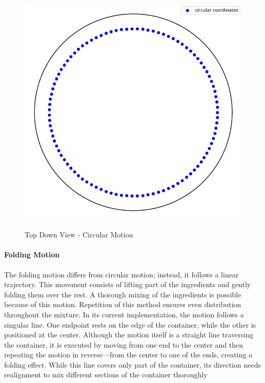 \begin{figure}[H]
    \includegraphics[scale=0.35]{Graphics/motions/circular_motion.png}
    \centering
    \label{fig:circularMotion}
    \caption{Top Down View - Circular Motion}
\end{figure}

\paragraph{Folding Motion}
The folding motion differs from circular motion; instead, it follows a linear trajectory.
This movement consists of lifting part of the ingredients and gently folding them over the rest.
A thorough mixing of the ingredients is possible because of this motion. Repetition of this method ensures even distribution throughout the mixture. 
\newline
\newline
In its current implementation, the motion follows a singular line. One endpoint rests on the edge of the container, while the other is positioned at the center.
Although the motion itself is a straight line traversing the container, it is executed by moving from one end to the center and then repeating 
the motion in reverse—from the center to one of the ends, creating a folding effect.
While this line covers only part of the container, its direction needs realignment to mix different sections of the container thoroughly


